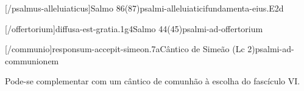 
\AllowPageFlush

[\Prefix/psalmus-alleluiaticus]{Salmo 86(87)}{psalmi-alleluiatici}{fundamenta-eius.E2d}

\AllowPageFlush

[\Prefix/offertorium]{diffusa-est-gratia.1g4}{Salmo 44(45)}{psalmi-ad-offertorium}

\AllowPageFlush

[\Prefix/communio]{responsum-accepit-simeon.7a}{Cântico de Simeão (Lc 2)}{psalmi-ad-communionem}

\begin{rubrica}
  Pode-se complementar com um cântico de comunhão à escolha do fascículo VI.
\end{rubrica}

\AllowPageBreak